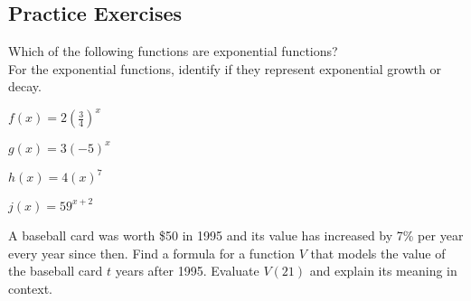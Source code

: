 
\newpage


\subsection*{Practice Exercises} \label{practice-exponential-intro}

\begin{myPractice}
Which of the following functions are exponential functions? \\
For the exponential functions, identify if they represent exponential growth or decay.
\begin{enumerate}
\begin{multicols}{4}
\item $f(x) = 2 \left(\frac{3}{4}\right)^x$
\item $g(x) = 3 \left(-5\right)^x$
\item $h(x) = 4 \left(x\right)^7$
\item $j(x) = 5 9^{x+2}$
\end{multicols}
\vfill
\end{enumerate}
\end{myPractice}


\begin{myPractice}
A baseball card was worth \$50 in 1995 and its value has increased by 7\% per year every year since then.  Find a formula for a function $V$ that models the value of the baseball card $t$ years after 1995.  
\vfill
Evaluate $V(21)$ and explain its meaning in context.
\vfill
\vfill

\end{myPractice}




